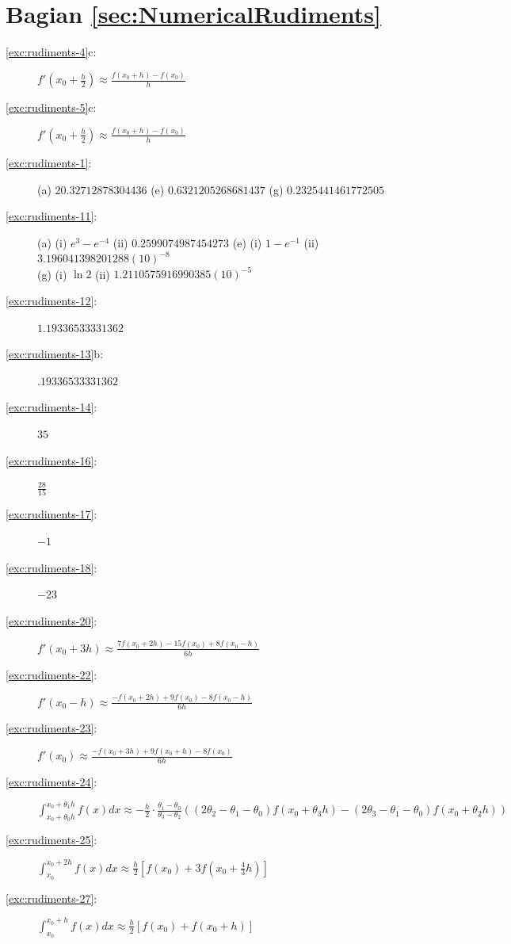 \section*{Bagian \ref{sec:NumericalRudiments}}
\begin{description}
\item [{\ref{exc:rudiments-4}c:}] $f'\left(x_{0}+\frac{h}{2}\right)\approx\frac{f(x_{0}+h)-f(x_{0})}{h}$
\item [{\ref{exc:rudiments-5}c:}] $f'\left(x_{0}+\frac{h}{2}\right)\approx\frac{f(x_{0}+h)-f(x_{0})}{h}$
\item [{\ref{exc:rudiments-1}:}] (a) $20.32712878304436$ (e) $0.6321205268681437$
(g) $0.2325441461772505$
\item [{\ref{exc:rudiments-11}:}] (a) (i) $e^{3}-e^{-4}$ (ii) $0.2599074987454273$
(e) (i) $1-e^{-1}$ (ii) $3.196041398201288(10)^{-8}$\\
(g) (i) $\ln2$ (ii) $1.2110575916990385(10)^{-5}$
\item [{\ref{exc:rudiments-12}:}] $1.19336533331362$
\item [{\ref{exc:rudiments-13}b:}] $.19336533331362$
\item [{\ref{exc:rudiments-14}:}] $35$
\item [{\ref{exc:rudiments-16}:}] $\frac{28}{15}$
\item [{\ref{exc:rudiments-17}:}] $-1$
\item [{\ref{exc:rudiments-18}:}] $-23$
\item [{\ref{exc:rudiments-20}:}] $f'(x_{0}+3h)\approx\frac{7f(x_{0}+2h)-15f(x_{0})+8f(x_{0}-h)}{6h}$
\item [{\ref{exc:rudiments-22}:}] $f'(x_{0}-h)\approx\frac{-f(x_{0}+2h)+9f(x_{0})-8f(x_{0}-h)}{6h}$
\item [{\ref{exc:rudiments-23}:}] $f'(x_{0})\approx\frac{-f(x_{0}+3h)+9f(x_{0}+h)-8f(x_{0})}{6h}$
\item [{\ref{exc:rudiments-24}:}] $\int_{x_{0}+\theta_{0}h}^{x_{0}+\theta_{1}h}f(x)dx\approx-\frac{h}{2}\cdot\frac{\theta_{1}-\theta_{0}}{\theta_{3}-\theta_{2}}\left((2\theta_{2}-\theta_{1}-\theta_{0})f(x_{0}+\theta_{3}h)-(2\theta_{3}-\theta_{1}-\theta_{0})f(x_{0}+\theta_{2}h)\right)$
\item [{\ref{exc:rudiments-25}:}] $\int_{x_{0}}^{x_{0}+2h}f(x)dx\approx\frac{h}{2}\left[f(x_{0})+3f\left(x_{0}+\frac{4}{3}h\right)\right]$
\item [{\ref{exc:rudiments-27}:}] $\int_{x_{0}}^{x_{0}+h}f(x)dx\approx\frac{h}{2}\left[f(x_{0})+f(x_{0}+h)\right]$
\end{description}

